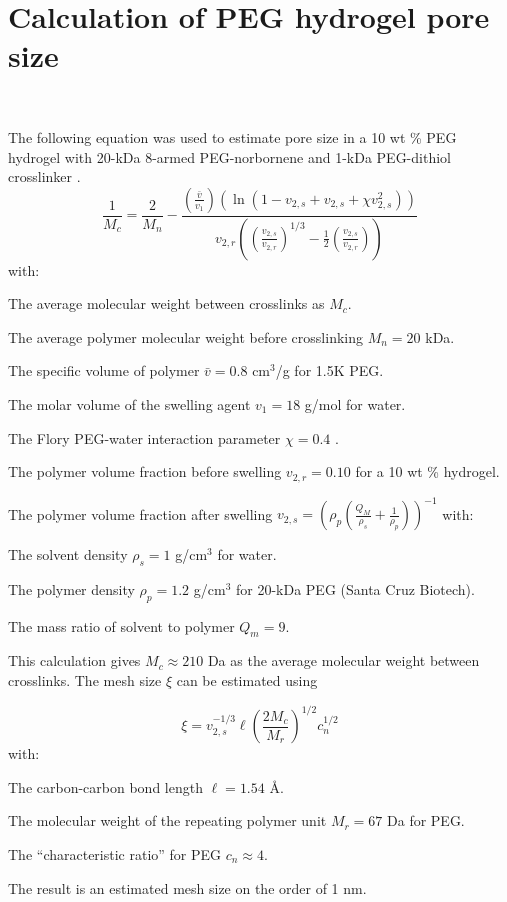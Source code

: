 \chapter{Calculation of PEG hydrogel pore size}~\label{appx:pore-calc}


The following equation was used to estimate pore size in a 10 wt \% PEG hydrogel with 20-kDa 8-armed PEG-norbornene and 1-kDa PEG-dithiol crosslinker \cite{canal89}.
\begin{equation}
\frac{1}{M_c} = \frac{2}{M_n}- \frac{\left(\frac{\bar{v}}{v_1}\right) \left(\ln (1-v_{2,s}+ v_{2,s} + \chi v_{2,s}^2)\right)}{v_{2,r} \left(\left(\frac{v_{2,s}}{v_{2,r}}\right)^{1/3} - \frac{1}{2}\left(\frac{v_{2,s}}{v_{2,r}}\right)\right)}
\end{equation}
with:

The average molecular weight between crosslinks as $M_c$.

The average polymer molecular weight before crosslinking $M_n = 20$ kDa.

The specific volume of polymer $\bar{v} = 0.8$ cm$^3$/g for 1.5K PEG.

The molar volume of the swelling agent $v_1 = 18$ g/mol for water.

The Flory PEG-water interaction parameter $\chi = 0.4$ \cite{mellott01}.

The polymer volume fraction before swelling $v_{2,r} = 0.10$ for a 10 wt \% hydrogel.

The polymer volume fraction after swelling $v_{2,s} = (\rho_p(\frac{Q_M}{\rho_s}+\frac{1}{\rho_p}))^{-1}$ \cite{datta07} with:

The solvent density $\rho_s = 1$ g/cm$^3$ for water.

The polymer density $\rho_p = 1.2$ g/cm$^3$ for 20-kDa PEG (Santa Cruz Biotech).

The mass ratio of solvent to polymer $Q_m = 9$.

This calculation gives $M_c \approx 210$ Da as the average molecular weight between crosslinks.  The mesh size $\xi$ can be estimated using \cite{canal89}

\begin{equation}
\xi = v_{2,s}^{-1/3} \ell \left(\frac{2M_c}{M_r}\right)^{1/2} c_n^{1/2}
\end{equation}
with:

The carbon-carbon bond length $\ell = 1.54$ \AA.

The molecular weight of the repeating polymer unit $M_r = 67$ Da for PEG.

The ``characteristic ratio'' for PEG $c_n \approx 4$.

The result is an estimated mesh size on the order of 1 nm.

